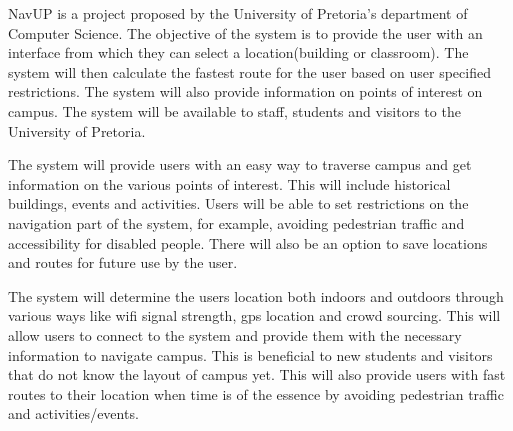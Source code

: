NavUP is a project proposed by the University of Pretoria's department of Computer Science. The objective of the system is to provide the user with an interface from which they can select a location(building or classroom). The system will then calculate the fastest route for the user based on user specified restrictions. The system will also provide information on points of interest on campus. The system will be available to staff, students and visitors to the University of Pretoria.
\par
\bigskip
\noindent
The system will provide users with an easy way to traverse campus and get information on the various points of interest. This will include historical buildings, events and activities. Users will be able to set restrictions on the navigation part of the system, for example, avoiding pedestrian traffic and accessibility for disabled people. There will also be an option to save locations and routes for future use by the user.
\par
\bigskip
\noindent
The system will determine the users location both indoors and outdoors through various ways like wifi signal strength, gps location and crowd sourcing. This will allow users to connect to the system and provide them with the necessary information to navigate campus. This is beneficial to new students and visitors that do not know the layout of campus yet. This will also provide users with fast routes to their location when time is of the essence by avoiding pedestrian traffic and activities/events.
